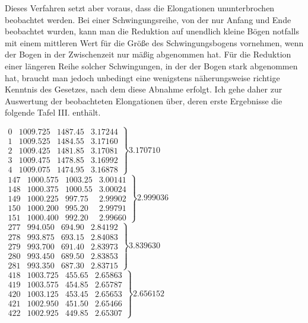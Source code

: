 Dieses Verfahren setzt aber voraus, dass die Elongationen ununterbrochen beobachtet werden. Bei einer Schwingungsreihe, von der nur Anfang und Ende beobachtet wurden, kann man die Reduktion auf unendlich kleine Bögen notfalls mit einem mittleren Wert für die Größe des Schwingungsbogens vornehmen, wenn der Bogen in der Zwischenzeit nur mäßig abgenommen hat. Für die Reduktion einer längeren Reihe solcher Schwingungen, in der der Bogen stark abgenommen hat, braucht man jedoch unbedingt eine wenigstens näherungsweise richtige
Kenntnis des Gesetzes, nach dem diese Abnahme erfolgt. Ich gehe daher zur Auswertung der beobachteten Elongationen über, deren erste Ergebnisse die folgende Tafel III. enthält.
\begin{center}
\fontsize{9}{11}\selectfont
$\left.\begin{array}{r|r|r|r}
0&1009.725&1487.45&3.17244\\
1&1009.525&1484.55&3.17160\\
2&1009.425&1481.85&3.17081\\
3&1009.475&1478.85&3.16992\\
4&1009.075&1474.95&3.16878
\end{array}\right\}3.170710$\\[6pt]
$\left.\begin{array}{r|r|r|r}
147&1000.575&1003.25&3.00141\\
148&1000.375&1000.55&3.00024\\
149&1000.225&997.75&2.99902\\
150&1000.200&995.20&2.99791\\
151&1000.400&992.20&2.99660
\end{array}\right\}2.999036$\\[6pt]
$\left.\begin{array}{r|r|r|r}
277&994.050&694.90&2.84192\\
278&993.875&693.15&2.84083\\
279&993.700&691.40&2.83973\\
280&993.450&689.50&2.83853\\
281&993.350&687.30&2.83715
\end{array}\right\}3.839630$\\[6pt]
$\left.\begin{array}{r|r|r|r}
418&1003.725&455.65&2.65863\\
419&1003.575&454.85&2.65787\\
420&1003.125&453.45&2.65653\\
421&1002.950&451.50&2.65466\\
422&1002.925&449.85&2.65307
\end{array}\right\}2.656152$
\end{center}

